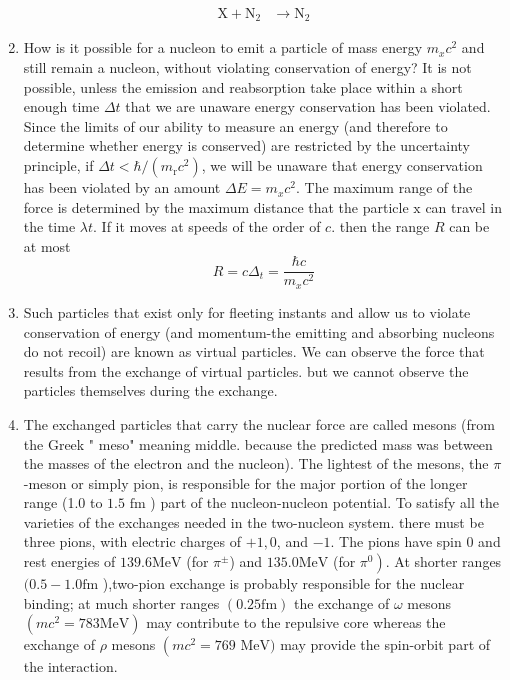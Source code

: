 \begin{enumerate}
$$\begin{aligned}
 	\mathrm{X}+\mathrm{N}_{2} & \rightarrow \mathrm{N}_{2}
 	\end{aligned}
 	$$
 	\item How is it possible for a nucleon to emit a particle of mass energy $m_{x} c^{2}$ and still remain a nucleon, without violating conservation of energy? It is not possible, unless the emission and reabsorption take place within a short enough time $\Delta t$ that we are unaware energy conservation has been violated. Since the limits of our ability to measure an energy (and therefore to determine whether energy is conserved) are restricted by the uncertainty principle, if $\Delta t<\hbar /\left(m_{\mathrm{r}} c^{2}\right)$, we will be unaware that energy conservation has been violated by an amount $\Delta E=m_{x} c^{2}$. The maximum range of the force is determined by the maximum distance that the particle $\mathrm{x}$ can travel in the time $\lambda t$. If it moves at speeds of the order of $c$. then the range $R$ can be at most 
 	$$R=c \Delta_{t}=\frac{\hbar c}{m_{x} c^{2}}$$
 	\item Such particles that exist only for fleeting instants and allow us to violate conservation of energy (and momentum-the emitting and absorbing nucleons do not recoil) are known as virtual particles. We can observe the force that results from the exchange of virtual particles. but we cannot observe the particles themselves during the exchange.
 	\item The exchanged particles that carry the nuclear force are called mesons (from the Greek " meso" meaning middle. because the predicted mass was between the masses of the electron and the nucleon). The lightest of the mesons, the $\pi$-meson or simply pion, is responsible for the major portion of the longer range (1.0 to $1.5$ $\mathrm{fm}$ ) part of the nucleon-nucleon potential. To satisfy all the varieties of the exchanges needed in the two-nucleon system. there must be three pions, with electric charges of $+1,0$, and $-1$. The pions have spin 0 and rest energies of $139.6 \mathrm{MeV}$ (for $\pi^{\pm}$) and $135.0 \mathrm{MeV}$ (for $\left.\pi^{0}\right)$. At shorter ranges $(0.5-1.0 \mathrm{fm}$ ),two-pion exchange is probably responsible for the nuclear binding; at much shorter ranges $(0.25 \mathrm{fm})$ the exchange of $\omega$ mesons $\left(m c^{2}=783 \mathrm{MeV}\right)$ may contribute to the repulsive core whereas the exchange of $\rho$ mesons $\left(m c^{2}=769\right.$ $\mathrm{MeV})$ may provide the spin-orbit part of the interaction.
 \end{enumerate}
